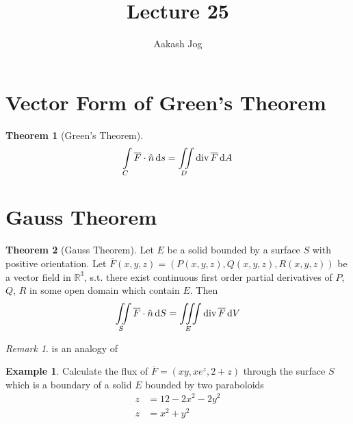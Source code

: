 \documentclass[fleqn, a4paper, 12pt]{article}
\title{Lecture 25}
\author{Aakash Jog}
\date{\formatdate{22}{1}{2015}}
\newcommand{\divergence}{\mathrm{div\,}}
\theoremstyle{definition}
\newtheorem{example}{Example}
\theoremstyle{theorem}
\newtheorem{theorem}{Theorem}
\theoremstyle{remark}
\newtheorem{remark}{Remark}
\begin{document}
	
\maketitle

\tableofcontents

\newpage

\section{Vector Form of Green's Theorem}

\begin{theorem}[Green's Theorem]
	\begin{equation*}
		\int\limits_{C} \overline{F} \cdot \hat{n} \dif s = \iint\limits_{D} \divergence \overline{F} \dif A
	\end{equation*}
	\label{Green's Theorem}
\end{theorem}

\section{Gauss Theorem}

\begin{theorem}[Gauss Theorem]
	Let $E$ be a solid bounded by a surface $S$ with positive orientation. Let $\overline{F}(x,y,z) = \left( P(x,y,z), Q(x,y,z), R(x,y,z) \right)$ be a vector field in $\mathbb{R}^3$, s.t. there exist continuous first order partial derivatives of $P$, $Q$, $R$ in some open domain which contain $E$. Then
	\begin{equation*}
		\iint\limits_{S} \overline{F} \cdot \hat{n} \dif S = \iiint\limits_{E} \divergence \overline{F} \dif V
	\end{equation*}
	\label{Gauss Theorem}
\end{theorem}

\begin{remark}
	 is an analogy of 
\end{remark}

\begin{example}
	Calculate the flux of $\overline{F} = (x y, x e^z, 2 + z)$ through the surface $S$ which is a boundary of a solid $E$ bounded by two paraboloids
	\begin{align*}
		z &= 12 - 2x^2 - 2y^2\\
		z &= x^2 + y^2
	\end{align*}
\end{example}
\end{document}
